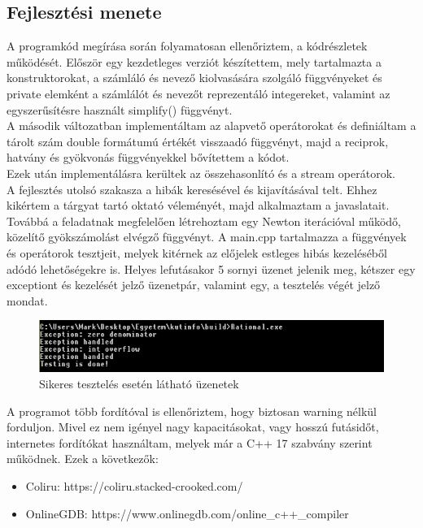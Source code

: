 \documentclass[a4paper, 12pt]{article}
\begin{document}
\subsection*{Fejlesztési menete}
\indent A programkód megírása során folyamatosan ellenőriztem, a kódrészletek működését.
Először egy kezdetleges verziót készítettem, mely tartalmazta a konstruktorokat, a számláló és nevező kiolvasására szolgáló függvényeket és private elemként a számlálót és nevezőt reprezentáló integereket, valamint az egyszerűsítésre használt simplify() függvényt. 
\\
\indent A második változatban implementáltam az alapvető operátorokat és definiáltam a tárolt szám double formátumú értékét visszaadó függvényt, majd a reciprok, hatvány és gyökvonás függvényekkel bővítettem a kódot.
\\
 Ezek után implementálásra kerültek az összehasonlító és a stream operátorok.
\\
\indent A fejlesztés utolsó szakasza a hibák keresésével és kijavításával telt. Ehhez kikértem a tárgyat tartó oktató véleményét, majd alkalmaztam a javaslatait. Továbbá a feladatnak megfelelően létrehoztam egy Newton iterációval működő, közelítő gyökszámolást elvégző függvényt. A main.cpp tartalmazza a függvények és operátorok tesztjeit, melyek kitérnek az előjelek estleges hibás kezeléséből adódó lehetőségekre is.
Helyes lefutásakor 5 sornyi üzenet jelenik meg, kétszer egy exceptiont és kezelését jelző üzenetpár, valamint egy, a tesztelés végét 
jelző mondat.
\begin{figure}[h!]
\includegraphics[width=1\textwidth]{succesful.png}
\caption{Sikeres tesztelés esetén látható üzenetek}
\end{figure}

A programot több fordítóval is ellenőriztem, hogy biztosan warning nélkül forduljon. Mivel ez nem igényel nagy kapacitásokat, vagy hosszú futásidőt, internetes fordítókat használtam, melyek már a C++ 17 szabvány szerint működnek.
Ezek a következők:
\begin{itemize}
	\item Coliru: https://coliru.stacked-crooked.com/
	\item OnlineGDB: https://www.onlinegdb.com/online\_c++\_compiler
\end{itemize}
\end{document}
